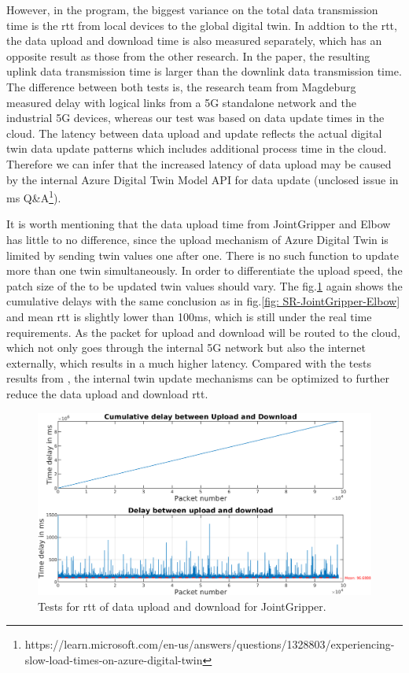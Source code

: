 However, in the program, the biggest variance 
on the total data transmission time is the \gls{rtt} from local devices to the global digital 
twin. In addtion to the \gls{rtt}, the data upload and download time is also measured 
separately, which has an opposite result as those from the other research\cite{cainelli_performance_2023}. 
In the paper, the resulting uplink data transmission time is larger than the downlink data transmission 
time. The difference between both tests is, the research team from Magdeburg 
measured delay with logical links from a 5G standalone network and the industrial 5G devices, 
whereas our test was based on data update times in the cloud. The latency 
between data upload and update reflects the actual digital twin data update 
patterns which includes additional process time in the cloud. Therefore we can 
infer that the increased latency of data upload may be caused by the internal 
Azure Digital Twin Model API for data update 
(unclosed issue in \gls{ms} Q\&A\footnote{https://learn.microsoft.com/en-us/answers/questions/1328803/experiencing-slow-load-times-on-azure-digital-twin}).
    

It is worth mentioning that the data upload time from JointGripper and Elbow 
has little to no difference, since the upload mechanism of Azure Digital Twin is limited 
by sending twin values one after one. There is no such function to update more than 
one twin simultaneously. In order to differentiate the upload speed, the patch size 
of the to be updated twin values should vary. The fig.\ref{fig: UD-cycle-JointGripper} 
again shows the cumulative delays with the same conclusion as in 
fig.\ref{fig: SR-JointGripper-Elbow} and mean \gls{rtt} is slightly lower than 
100ms, which is still under the real time requirements. As the packet for upload 
and download will be routed to the cloud, which not only goes through 
the internal 5G network but also the internet externally, which results in a much 
higher latency. Compared with the tests results from \cite{cainelli_performance_2023}, 
the internal twin update mechanisms can be optimized to further reduce the data 
upload and download \gls{rtt}. 


\begin{figure}[htb]
    \includegraphics[width=\textwidth]{figures/tests/DT/Delay_UploadDownloadCycleTime_JointGripper.png}
    \centering
    \caption{Tests for \gls{rtt} of data upload and download for JointGripper. \label{fig: UD-cycle-JointGripper}}
\end{figure}

